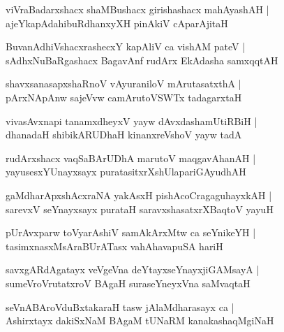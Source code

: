 \documentclass[twoside,12pt,openright]{book}
\newcounter{shloka}[chapter]
\begin{document}
\begin{shloka}%
viVraBadarxshacx shaMBushacx girishashacx mahAyashAH |\\
ajeYkapAdahibuRdhanxyXH pinAkiV cAparAjitaH 
\end{shloka}

\begin{shloka}%
BuvanAdhiVshacxrashecxY kapAliV ca vishAM pateV |\\
sAdhxNuBaRgashacx BagavAnf rudArx EkAdasha samxqqtAH 
\end{shloka}

\begin{shloka}%
shavxsanasapxshaRnoV vAyuraniloV mArutasatxthA |\\
pArxNApAnw sajeVvw camArutoVSWTx tadagarxtaH
\end{shloka}

\begin{shloka}%
vivasAvxnapi tanamxdheyxV yayw dAvxdashamUtiRBiH |\\
dhanadaH shibikARUDhaH kinanxreVshoV yayw tadA
\end{shloka}

\begin{shloka}%
rudArxshacx vaqSaBArUDhA marutoV maqgavAhanAH |\\
yayusesxYUnayxsayx puratasitxrXshUlapariGAyudhAH 
\end{shloka}

\begin{shloka}%
gaMdharApxshAcxraNA yakAsxH pishAcoCragaguhayxkAH |\\
sarevxV seYnayxsayx purataH saravxshasatxrXBaqtoV yayuH 
\end{shloka}

\begin{shloka}%
pUrAvxparw toVyarAshiV samAkArxMtw ca seYnikeYH |\\
tasimxnasxMsAraBUrATasx vahAhavapuSA hariH 
\end{shloka}

\begin{shloka}%
savxgARdAgatayx veVgeVna deYtayxseYnayxjiGAMsayA |\\
sumeVroVrutatxroV BAgaH suraseYneyxVna saMvaqtaH 
\end{shloka}

\begin{shloka}%
seVnABAroVduBxtakaraH tasw jAlaMdharasayx ca |\\
Ashirxtayx dakiSxNaM BAgaM tUNaRM kanakashaqMgiNaH 
\end{shloka}
\end{document}

